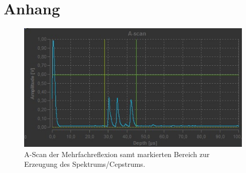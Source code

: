 \section{Anhang}
\label{sec:Anhang}


\begin{figure}
  \centering
  \includegraphics[width=\textwidth]{Messdaten/ascan.jpg}
  \caption{A-Scan der Mehrfachreflexion samt markierten Bereich zur Erzeugung des Spektrums/Cepstrums.}
  \label{fig:spekcep}
\end{figure}
